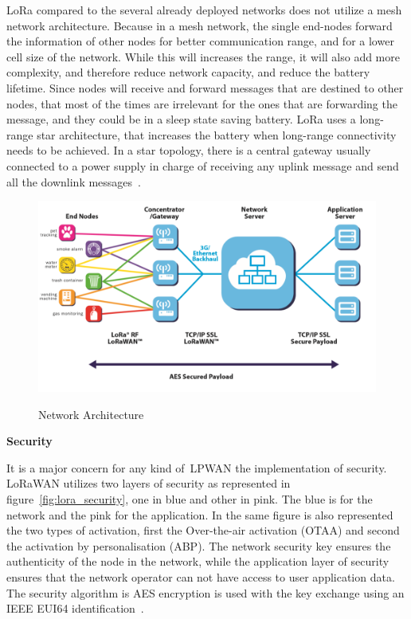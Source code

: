 LoRa compared to the several already deployed networks does not utilize a mesh network architecture. Because in a mesh network, the single end-nodes forward the information of other nodes for better communication range, and for a lower cell size of the network. While this will increases the range, it will also add more complexity, and therefore reduce network capacity, and reduce the  battery lifetime. Since nodes will receive and forward messages that are destined to other nodes, that most of the times are irrelevant for the ones that are forwarding the message, and they could be in a sleep state saving battery. LoRa uses a long-range star architecture, that increases the battery when long-range connectivity needs to be achieved. In a star topology, there is a central gateway usually connected to a power supply in charge of receiving any uplink message and send all the downlink messages~\cite{LPLoRaAlliance2018}.
\begin{figure}[htbp]
  \centering
    {\includegraphics[height=2.1 in,width=0.75\linewidth]{Chapters/Figures/loranetwork.PNG}}%
  \caption{Network Architecture~\cite{LPLoRaAlliance2018}}
  \label{fig:lora_network_a}
\end{figure}

\textbf{Security }

It is a major concern for any kind of~\gls{LPWAN} the implementation of security. LoRaWAN utilizes two layers of security as represented in figure~\ref{fig:lora_security}, one in blue and other in pink. The blue is for the network and the pink for the application. In the same figure is also represented the two types of activation, first the Over-the-air activation (OTAA) and second the activation by personalisation (ABP).
The network security key ensures the authenticity  of the node in the network, while the application layer of security ensures that the network operator can not have access to user application data. The security algorithm is AES encryption is used with the key exchange using an IEEE EUI64 identification~\cite{Navarro-Ortiz2018}. \newline\newline\newline\newline
 

